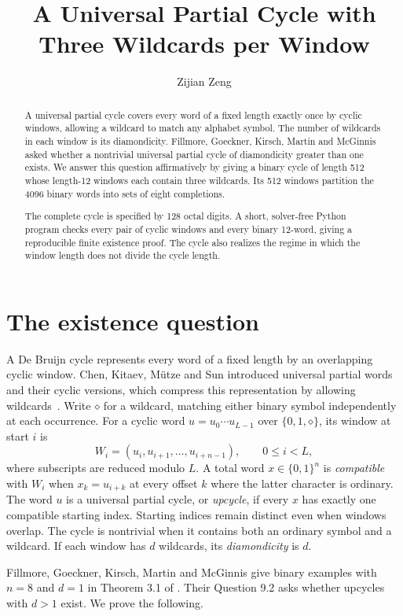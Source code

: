 \documentclass[acmsmall,nonacm,11pt,natbib=false]{acmart}
\title{A Universal Partial Cycle with Three Wildcards per Window}
\author{Zijian Zeng}
\affiliation{\institution{UCSI University}\country{Malaysia}}
\date{}
\newcommand{\wild}{\mathord{\diamond}}
\begin{document}
\begin{abstract}
A universal partial cycle covers every word of a fixed length exactly once
by cyclic windows, allowing a wildcard to match any alphabet symbol. The
number of wildcards in each window is its diamondicity. Fillmore,
Goeckner, Kirsch, Martin and McGinnis asked whether a nontrivial universal
partial cycle of diamondicity greater than one exists. We answer this
question affirmatively by giving a binary cycle of length 512 whose
length-12 windows each contain three wildcards. Its 512 windows partition
the 4096 binary words into sets of eight completions.

The complete cycle is specified by 128 octal digits. A short, solver-free
Python program checks every pair of cyclic windows and every binary
12-word, giving a reproducible finite existence proof. The cycle also
realizes the regime in which the window length does not divide the cycle
length.
\end{abstract}
\maketitle
\pagestyle{plain}
\thispagestyle{empty}
\clearpage

\section{The existence question}

A De Bruijn cycle represents every word of a fixed length by an overlapping
cyclic window. Chen, Kitaev, M\"utze and Sun introduced universal partial
words and their cyclic versions, which compress this representation by
allowing wildcards~\cite{CKMS17}. Write $\wild$ for a wildcard, matching either binary
symbol independently at each occurrence. For a cyclic word
$u=u_0\cdots u_{L-1}$ over $\{0,1,\wild\}$, its window at start $i$ is
\[
  W_i=(u_i,u_{i+1},\ldots,u_{i+n-1}),
  \qquad 0\leq i<L,
\]
where subscripts are reduced modulo $L$. A total word $x\in\{0,1\}^n$ is
\emph{compatible} with $W_i$ when $x_k=u_{i+k}$ at every offset $k$ where
the latter character is ordinary. The word $u$ is a universal partial
cycle, or \emph{upcycle}, if every $x$ has exactly one compatible starting
index. Starting indices remain distinct even when windows overlap. The
cycle is nontrivial when it contains both an ordinary symbol and a
wildcard. If each window has $d$ wildcards, its \emph{diamondicity} is $d$.

Fillmore, Goeckner, Kirsch, Martin and McGinnis give binary examples with
$n=8$ and $d=1$ in Theorem 3.1 of \cite{FGKMM26}. Their Question 9.2 asks
whether upcycles with $d>1$ exist. We prove the following.
\end{document}
